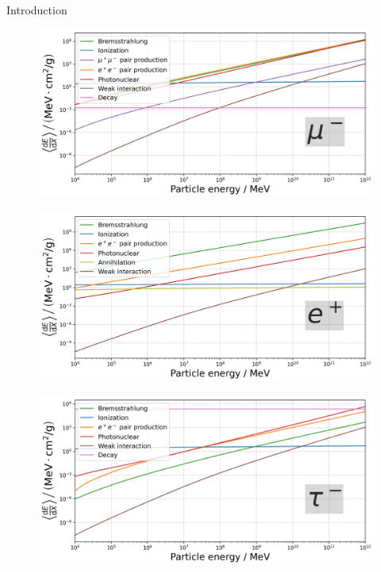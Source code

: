 \documentclass[t]{beamer}
\begin{document}
\begin{block}[equal height group=A]{Introduction}
\begin{multicols}{2}
          \columnbreak
          \begin{multicols}{2}
            \begin{figure}
              \includegraphics[width=\linewidth, height=.4\textheight, keepaspectratio]{plots/muon_dEdx.png}
            \end{figure}
            \begin{figure}
              \includegraphics[width=\linewidth, height=.4\textheight, keepaspectratio]{plots/positron_dEdx.png}
            \end{figure}
            \columnbreak
            \begin{figure}
              \includegraphics[width=\linewidth, height=.4\textheight, keepaspectratio]{plots/tau_dEdx.png}

\end{figure}
\end{multicols}
\end{multicols}
\end{block}
\end{document}
